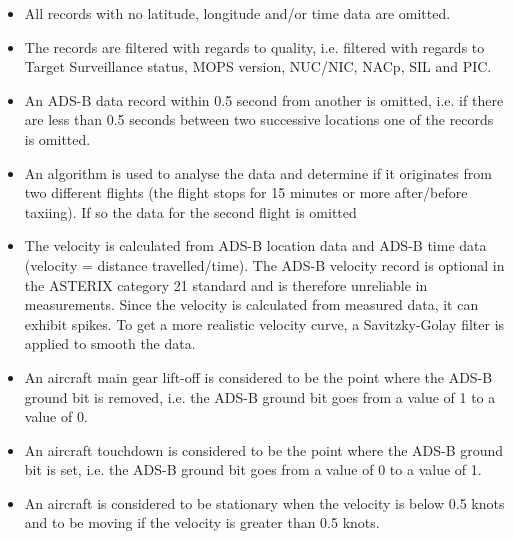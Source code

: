 \begin{itemize}
    \item All records with no latitude, longitude and/or time data are omitted.
    \item The records are filtered with regards to quality, i.e. filtered with regards to Target Surveillance status, MOPS version, NUC/NIC, NACp, SIL and PIC.
    \item An ADS-B data record within 0.5 second from another is omitted, i.e. if there are less than 0.5 seconds between two successive locations one of the records is omitted.
    \item An algorithm is used to analyse the data and determine if it originates from two different flights (the flight stops for 15 minutes or more after/before taxiing). If so the data for the second flight is omitted
    \item The velocity is calculated from ADS-B location data and ADS-B time data (velocity = distance travelled/time). The ADS-B velocity record is optional in the ASTERIX category 21 standard and is therefore unreliable in measurements. Since the velocity is calculated from measured data, it can exhibit spikes. To get a more realistic velocity curve, a Savitzky-Golay filter is applied to smooth the data.
    \item An aircraft main gear lift-off is considered to be the point where the ADS-B ground bit is removed, i.e. the ADS-B ground bit goes from a value of 1 to a value of 0.
    \item An aircraft touchdown is considered to be the point where the ADS-B ground bit is set, i.e. the ADS-B ground bit goes from a value of 0 to a value of 1.
    \item An aircraft is considered to be stationary when the velocity is below 0.5 knots and to be moving if the velocity is greater than 0.5 knots.
    \cite{isavia_wiki}
\end{itemize}



